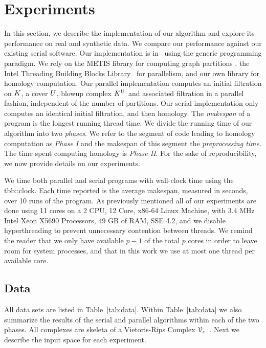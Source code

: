 \section{Experiments}
\vspace{-5mm} 
\label{sec:exp}
In this section, we describe the implementation of our algorithm
and explore its performance on real and synthetic data. We compare our
performance against our existing serial software. Our implementation is in 
\cplusplus\, using the generic programming paradigm. 
We rely on the METIS library for computing graph partitions 
\cite{KaKu95}, the Intel Threading Building Blocks 
Library~\cite{IntelTBB} for parallelism, and our own
library for homology computation. Our parallel implementation computes
an initial filtration on $K$, a cover $U$, blowup complex 
$K^{U}$ and associated filtration in a parallel fashion,
independent of the number of partitions. Our serial implementation only
computes an identical initial filtration, and then homology.
The \emph{makespan} of a program is the longest running thread time.
We divide the running time of our algorithm into two \emph{phases}.
We refer to the segment of code leading to homology computation as 
\emph{Phase I} and the makespan of this segment 
the \emph{preprocessing time}. The time spent computing homology is
\emph{Phase II}.
For the sake of reproducibility, we now provide details on our experiments.

We time both parallel and serial programs with wall-clock time
using the tbb::clock. Each time reported is the average makespan,
measured in seconds, over 10 runs of the program.
As previously mentioned all of our experiments are done 
using 11 cores on a 2 CPU, 12 Core, x86-64 Linux Machine, with 3.4 MHz Intel 
Xeon X5690 Processors, 49 GB of RAM, SSE 4.2, and we disable hyperthreading 
to prevent unnecessary contention between threads. We remind the reader that we 
only have available $p-1$ of the total $p$ cores in order to leave room for 
system processes, and that in this work we use at most one thread per available 
core. 
\subsection{Data}

All data sets are listed in Table~\ref{tab:data}. 
Within Table~\ref{tab:data} we also summarize the results of 
the serial and parallel algorithms within each of the two phases.
All complexes are skeleta of a Vietoris-Rips Complex 
$\mathcal{V}_\epsilon$~\cite{z-fcv-10}. Next we describe the input space for each 
experiment. 


